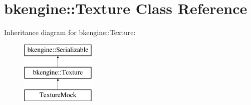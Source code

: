 \hypertarget{classbkengine_1_1Texture}{}\section{bkengine\+:\+:Texture Class Reference}
\label{classbkengine_1_1Texture}
Inheritance diagram for bkengine\+:\+:Texture\+:\begin{figure}[H]
\begin{center}
\leavevmode
\includegraphics[height=3.000000cm]{classbkengine_1_1Texture}
\end{center}
\end{figure}
